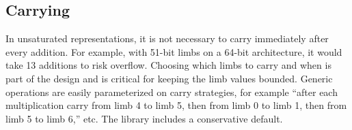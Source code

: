 \documentclass[conference,letterpaper]{IEEEtran}
\begin{document}
%

\subsection{Carrying}

In unsaturated representations, it is not necessary to carry immediately after every addition.
For example, with 51-bit limbs on a 64-bit architecture, it would take 13 additions to risk overflow.
Choosing which limbs to carry and when is part of the design and is critical for keeping the limb values bounded.
Generic operations are easily parameterized on carry strategies, for example ``after each multiplication carry from limb 4 to limb 5, then from limb 0 to limb 1, then from limb 5 to limb 6,'' etc.
The library includes a conservative default.
\end{document}
